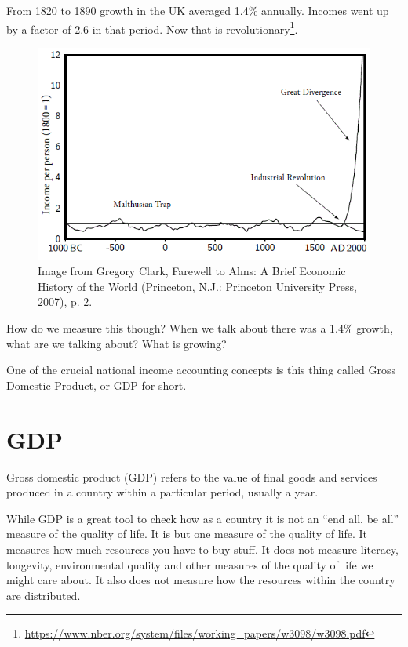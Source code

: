 \documentclass[
]{book}
\begin{document}
From 1820 to 1890 growth in the UK averaged 1.4\% annually. Incomes went up by a factor of 2.6 in that period. Now that is revolutionary\footnote{\url{https://www.nber.org/system/files/working_papers/w3098/w3098.pdf}}.

\begin{figure}

{\centering \includegraphics[width=1\linewidth]{img/ch1/fig2} 

}

\caption{Image from Gregory Clark, Farewell to Alms: A Brief Economic History of the World (Princeton, N.J.: Princeton University Press, 2007), p. 2.}\label{fig:fig102}
\end{figure}

How do we measure this though? When we talk about there was a 1.4\% growth, what are we talking about? What is growing?

One of the crucial national income accounting concepts is this thing called Gross Domestic Product, or GDP for short.

\hypertarget{gdp}{%
\section{GDP}\label{gdp}}

Gross domestic product (GDP) refers to the value of final goods and services produced in a country within a particular period, usually a year.

While GDP is a great tool to check how as a country it is not an ``end all, be all'' measure of the quality of life. It is but one measure of the quality of life. It measures how much resources you have to buy stuff. It does not measure literacy, longevity, environmental quality and other measures of the quality of life we might care about. It also does not measure how the resources within the country are distributed.
\end{document}
